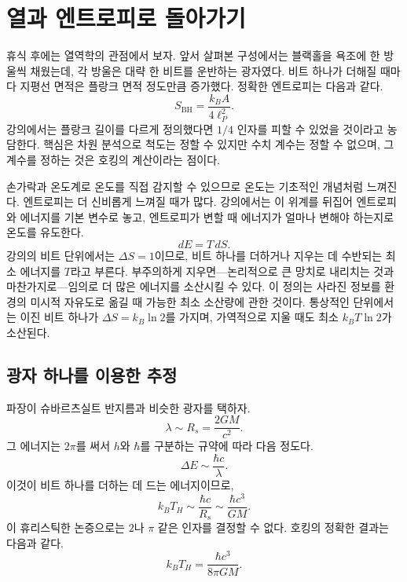 \section{열과 엔트로피로 돌아가기}

휴식 후에는 열역학의 관점에서 보자. 앞서 살펴본 구성에서는 블랙홀을 욕조에 한 방울씩 채웠는데, 각 방울은 대략 한 비트를 운반하는 광자였다. 비트 하나가 더해질 때마다 지평선 면적은 플랑크 면적 정도만큼 증가했다. 정확한 엔트로피는 다음과 같다.
\begin{equation}
S_{\mathrm{BH}}=\frac{k_B A}{4\ell_P^2}.
\end{equation}
강의에서는 플랑크 길이를 다르게 정의했다면 \(1/4\) 인자를 피할 수 있었을 것이라고 농담한다. 핵심은 차원 분석으로 척도는 정할 수 있지만 수치 계수는 정할 수 없으며, 그 계수를 정하는 것은 호킹의 계산이라는 점이다.

손가락과 온도계로 온도를 직접 감지할 수 있으므로 온도는 기초적인 개념처럼 느껴진다. 엔트로피는 더 신비롭게 느껴질 때가 많다. 강의에서는 이 위계를 뒤집어 엔트로피와 에너지를 기본 변수로 놓고, 엔트로피가 변할 때 에너지가 얼마나 변해야 하는지로 온도를 유도한다.
\begin{equation}
dE=T\,dS.
\end{equation}
강의의 비트 단위에서는 \(\Delta S=1\)이므로, 비트 하나를 더하거나 지우는 데 수반되는 최소 에너지를 \(T\)라고 부른다. 부주의하게 지우면---논리적으로 큰 망치로 내리치는 것과 마찬가지로---임의로 더 많은 에너지를 소산시킬 수 있다. 이 정의는 사라진 정보를 환경의 미시적 자유도로 옮길 때 가능한 최소 소산량에 관한 것이다. 통상적인 단위에서는 이진 비트 하나가 \(\Delta S=k_B\ln2\)를 가지며, 가역적으로 지울 때도 최소 \(k_BT\ln2\)가 소산된다.

\subsection{광자 하나를 이용한 추정}

파장이 슈바르츠실트 반지름과 비슷한 광자를 택하자.
\begin{equation}
\lambda\sim R_s=\frac{2GM}{c^2}.
\end{equation}
그 에너지는 \(2\pi\)를 써서 \(h\)와 \(\hbar\)를 구분하는 규약에 따라 다음 정도다.
\begin{equation}
\Delta E\sim \frac{\hbar c}{\lambda}.
\end{equation}
이것이 비트 하나를 더하는 데 드는 에너지이므로,
\begin{equation}
k_BT_H\sim\frac{\hbar c}{R_s}
\sim\frac{\hbar c^3}{GM}.
\label{eq:l03-hawking-scale}
\end{equation}
이 휴리스틱한 논증으로는 \(2\)나 \(\pi\) 같은 인자를 결정할 수 없다. 호킹의 정확한 결과는 다음과 같다.
\begin{equation}
\boxed{k_BT_H=\frac{\hbar c^3}{8\pi GM}.}
\label{eq:l03-hawking-exact}
\end{equation}


